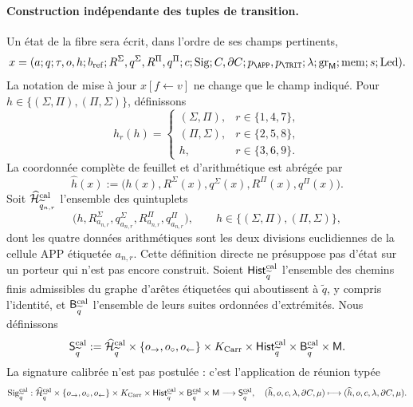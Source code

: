 \paragraph{Construction indépendante des tuples de transition.}
Un état de la fibre sera écrit, dans l’ordre de ses champs pertinents,
\[
 x=(a;q;\tau,o,h;b_{\rm ref};
       R^\Sigma,q^\Sigma,R^\Pi,q^\Pi;c;
       \operatorname{Sig};C,\partial C;p_{\APP},p_{\TRIT};
       \lambda;\operatorname{gr}_{\mathsf M};\operatorname{mem};
       s;\operatorname{Led}).
\]
La notation de mise à jour \(x[f\leftarrow v]\) ne change que le champ
indiqué. Pour \(h\in\{(\Sigma,\Pi),(\Pi,\Sigma)\}\), définissons
\[
 h_r(h)=
 \begin{cases}
  (\Sigma,\Pi),&r\in\{1,4,7\},\\
  (\Pi,\Sigma),&r\in\{2,5,8\},\\
 h,&r\in\{3,6,9\}.
 \end{cases}
\]
La coordonnée complète de feuillet et d’arithmétique est abrégée par
\[
 \widehat h(x):=
 \bigl(h(x),R^\Sigma(x),q^\Sigma(x),R^\Pi(x),q^\Pi(x)\bigr).
\]
Soit \(\widehat{\mathcal H}^{\rm cal}_{\widetilde q_{n,r}}\) l’ensemble des
quintuplets
\[
 \bigl(h,R^\Sigma_{a_{n,r}},q^\Sigma_{a_{n,r}},
          R^\Pi_{a_{n,r}},q^\Pi_{a_{n,r}}\bigr),
 \qquad
 h\in\{(\Sigma,\Pi),(\Pi,\Sigma)\},
\]
dont les quatre données arithmétiques sont les deux divisions euclidiennes de la cellule
APP étiquetée \(a_{n,r}\). Cette définition directe ne présuppose pas d’état
sur un porteur qui n’est pas encore construit. Soient
\(\mathsf{Hist}^{\rm cal}_{\widetilde q}\) l’ensemble des chemins finis
admissibles du graphe d’arêtes étiquetées qui aboutissent à
\(\widetilde q\), y compris l’identité, et
\(\mathsf B^{\rm cal}_{\widetilde q}\) l’ensemble de leurs suites
ordonnées d’extrémités. Nous définissons
\[
 \mathsf S^{\rm cal}_{\widetilde q}:=
 \widehat{\mathcal H}^{\rm cal}_{\widetilde q}
 \times\{o_{\rightarrow},o_{\circ},o_{\leftarrow}\}
 \times K_{\rm Carr}\times
 \mathsf{Hist}^{\rm cal}_{\widetilde q}\times
 \mathsf B^{\rm cal}_{\widetilde q}\times\mathsf M .
\]
La signature calibrée n’est pas postulée : c’est l’application de réunion typée
\[
 \operatorname{Sig}^{\rm cal}_{\widetilde q}:
 \widehat{\mathcal H}^{\rm cal}_{\widetilde q}
 \times\{o_{\rightarrow},o_{\circ},o_{\leftarrow}\}
 \times K_{\rm Carr}\times
 \mathsf{Hist}^{\rm cal}_{\widetilde q}\times
 \mathsf B^{\rm cal}_{\widetilde q}\times\mathsf M
 \longrightarrow\mathsf S^{\rm cal}_{\widetilde q},
\quad
 (\widehat h,o,c,\lambda,\partial C,\mu)
 \longmapsto(\widehat h,o,c,\lambda,\partial C,\mu).
\]
